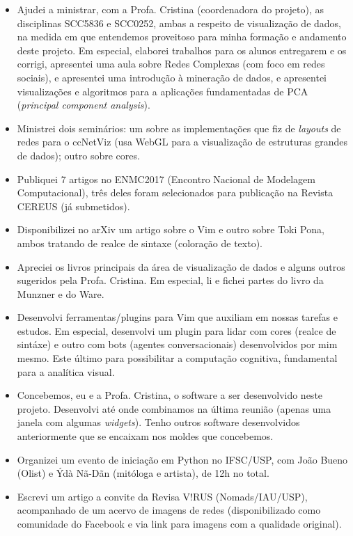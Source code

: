 \documentclass[a4paper, 11pt]{article}
\begin{document}
\begin{itemize}
  \item Ajudei a ministrar, com a Profa. Cristina (coordenadora do projeto), as disciplinas SCC5836 e SCC0252, ambas a respeito de visualização de dados, na medida em que entendemos proveitoso para minha formação e andamento deste projeto.
  Em especial, elaborei trabalhos para os alunos entregarem e os corrigi, apresentei uma aula sobre Redes Complexas (com foco em redes sociais), e apresentei uma introdução à mineração de dados, e apresentei visualizações e algoritmos para a aplicações fundamentadas de PCA (\emph{principal component analysis}).
  \item Ministrei dois seminários: um sobre as implementações que fiz de \emph{layouts} de redes para o ccNetViz (usa WebGL para a visualização de estruturas grandes de dados); outro sobre cores.
  \item Publiquei 7 artigos no ENMC2017 (Encontro Nacional de Modelagem Computacional), três deles foram selecionados para publicação na Revista CEREUS (já submetidos).
  \item Disponibilizei no arXiv um artigo sobre o Vim e outro sobre Toki Pona, ambos tratando de realce de sintaxe (coloração de texto).
  \item Apreciei os livros principais da área de visualização de dados e alguns outros sugeridos pela Profa. Cristina. Em especial, li e fichei partes do livro da Munzner e do Ware.
  \item Desenvolvi ferramentas/plugins para Vim que auxiliam em nossas tarefas e estudos. Em especial, desenvolvi um plugin para lidar com cores (realce de sintáxe) e outro com bots (agentes conversacionais) desenvolvidos por mim mesmo. Este último para possibilitar a computação cognitiva, fundamental para a analítica visual.
  \item Concebemos, eu e a Profa. Cristina, o software a ser desenvolvido neste projeto. Desenvolvi até onde combinamos na última reunião (apenas uma janela com algumas \emph{widgets}). Tenho outros software desenvolvidos anteriormente que se encaixam nos moldes que concebemos.
  \item Organizei um evento de iniciação em Python no IFSC/USP, com João Bueno (Olist) e Ýdà Nã-Dãn (mitóloga e artista), de 12h no total.
  \item Escrevi um artigo a convite da Revisa V!RUS (Nomads/IAU/USP), acompanhado de um acervo de imagens de redes (disponibilizado como comunidade do Facebook e via link para imagens com a qualidade original).

\end{itemize}
\end{document}
